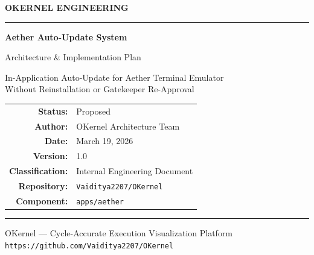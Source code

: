 \documentclass[11pt, a4paper]{article}
\begin{document}
\thispagestyle{empty}

\vspace*{2cm}

\begin{center}

{\fontsize{14}{16}\selectfont\textcolor{accentblue}{\textbf{OKERNEL ENGINEERING}}}

\vspace{0.3cm}
\textcolor{accentblue}{\rule{0.6\textwidth}{1.5pt}}

\vspace{1.5cm}

{\fontsize{28}{34}\selectfont\textbf{Aether Auto-Update System}}

\vspace{0.5cm}

{\fontsize{16}{20}\selectfont\textcolor{sectioncolor}{Architecture \& Implementation Plan}}

\vspace{2cm}

{\fontsize{12}{16}\selectfont\textcolor{accentblue}{In-Application Auto-Update for Aether Terminal Emulator\\Without Reinstallation or Gatekeeper Re-Approval}}

\vspace{3cm}

\begin{tabular}{rl}
\textbf{Status:} & Proposed \\[4pt]
\textbf{Author:} & OKernel Architecture Team \\[4pt]
\textbf{Date:} & March 19, 2026 \\[4pt]
\textbf{Version:} & 1.0 \\[4pt]
\textbf{Classification:} & Internal Engineering Document \\[4pt]
\textbf{Repository:} & \texttt{Vaiditya2207/OKernel} \\[4pt]
\textbf{Component:} & \texttt{apps/aether} \\
\end{tabular}

\vfill

\textcolor{accentblue}{\rule{0.6\textwidth}{0.5pt}}

\vspace{0.3cm}
{\small\textcolor{accentblue}{OKernel --- Cycle-Accurate Execution Visualization Platform}}\\
{\small\textcolor{accentblue}{\texttt{https://github.com/Vaiditya2207/OKernel}}}

\end{center}
\end{document}
